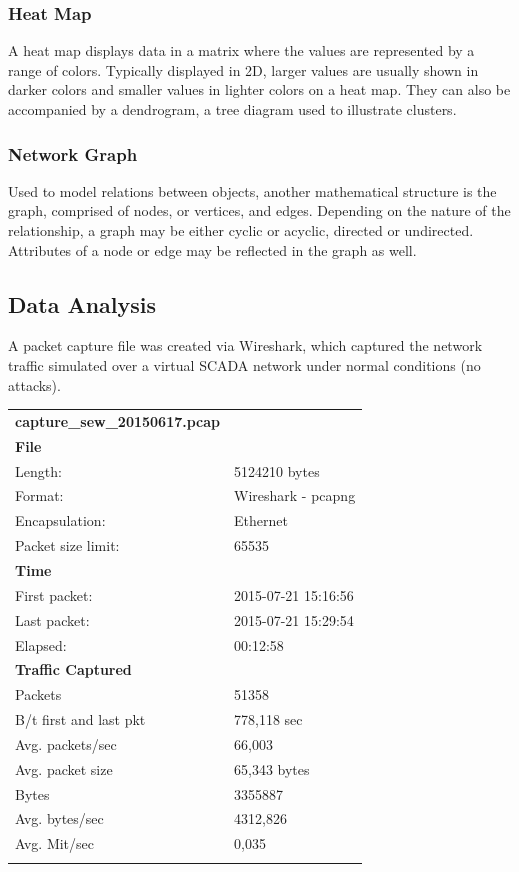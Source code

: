 \documentclass[12pt,]{article}
\begin{document}
\subsubsection{Heat Map}\label{heat-map}

A heat map displays data in a matrix where the values are represented by
a range of colors. Typically displayed in 2D, larger values are usually
shown in darker colors and smaller values in lighter colors on a heat
map. They can also be accompanied by a dendrogram, a tree diagram used
to illustrate clusters.

\subsubsection{Network Graph}\label{network-graph}

Used to model relations between objects, another mathematical structure
is the graph, comprised of nodes, or vertices, and edges. Depending on
the nature of the relationship, a graph may be either cyclic or acyclic,
directed or undirected. Attributes of a node or edge may be reflected in
the graph as well.

\subsection{Data Analysis}\label{data-analysis}

A packet capture file was created via Wireshark, which captured the
network traffic simulated over a virtual SCADA network under normal
conditions (no attacks).

\begin{longtable}[c]{@{}ll@{}}
\toprule\addlinespace
\textbf{capture\_sew\_20150617.pcap} &
\\\addlinespace
\midrule\endhead
\textbf{File} &
\\\addlinespace
Length: & 5124210 bytes
\\\addlinespace
Format: & Wireshark - pcapng
\\\addlinespace
Encapsulation: & Ethernet
\\\addlinespace
Packet size limit: & 65535
\\\addlinespace
\textbf{Time} &
\\\addlinespace
First packet: & 2015-07-21 15:16:56
\\\addlinespace
Last packet: & 2015-07-21 15:29:54
\\\addlinespace
Elapsed: & 00:12:58
\\\addlinespace
\textbf{Traffic Captured} &
\\\addlinespace
Packets & 51358
\\\addlinespace
B/t first and last pkt & 778,118 sec
\\\addlinespace
Avg. packets/sec & 66,003
\\\addlinespace
Avg. packet size & 65,343 bytes
\\\addlinespace
Bytes & 3355887
\\\addlinespace
Avg. bytes/sec & 4312,826
\\\addlinespace
Avg. Mit/sec & 0,035
\\\addlinespace
\bottomrule
\end{longtable}
\end{document}
